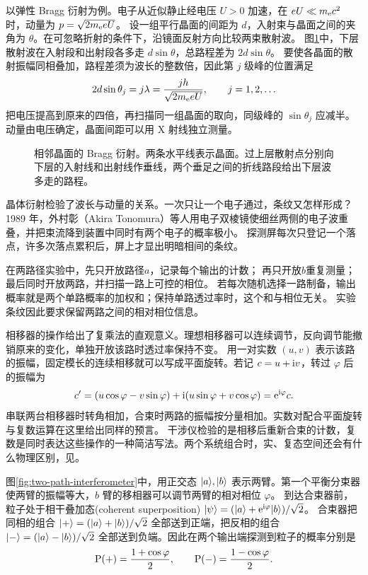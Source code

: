 以弹性 Bragg 衍射为例。电子从近似静止经电压 $U > 0$ 加速，在 $eU \ll m_\electron c^2$ 时，动量为 $p = \sqrt{2m_\electron eU}$。
设一组平行晶面的间距为 $d$，入射束与晶面之间的夹角为 $\theta$。在可忽略折射的条件下，沿镜面反射方向比较两束散射波。
图\ref{fig:bragg-path-difference}中，下层散射波在入射段和出射段各多走 $d\sin\theta$，总路程差为 $2d\sin\theta$。
要使各晶面的散射振幅同相叠加，路程差须为波长的整数倍，因此第 $j$ 级峰的位置满足
\begin{equation}\label{eq:qm-electron-bragg-condition}
    2d\sin\theta_j = j\lambda = \frac{jh}{\sqrt{2m_\electron eU}},\qquad j = 1,2,\ldots
\end{equation}
把电压提高到原来的四倍，再扫描同一组晶面的取向，同级峰的 $\sin\theta_j$ 应减半。动量由电压确定，晶面间距可以用 X 射线独立测量。

\begin{figure}[htbp]
    \centering{}
    \caption{相邻晶面的 Bragg 衍射。两条水平线表示晶面。过上层散射点分别向下层的入射线和出射线作垂线，两个垂足之间的折线路段给出下层波多走的路程。}
    \label{fig:bragg-path-difference}
\end{figure}

晶体衍射检验了波长与动量的关系。一次只让一个电子通过，条纹又怎样形成？1989 年，\label{exp:qm-tonomura}外村彰（Akira Tonomura）等人用电子双棱镜使细丝两侧的电子波重叠，并把束流降到装置中同时有两个电子的概率极小。
探测屏每次只登记一个落点，许多次落点累积后，屏上才显出明暗相间的条纹\cite{tonomura}。

在两路径实验中，先只开放路径$a$，记录每个输出的计数；
再只开放$b$重复测量；最后同时开放两路，并扫描一路上可控的相位。
若每次随机选择一路制备，输出概率就是两个单路概率的加权和；保持单路透过率时，这个和与相位无关。
实验条纹因此要求保留两路之间的相对相位信息。

相移器的操作给出了复乘法的直观意义。理想相移器可以连续调节，反向调节能撤销原来的变化，单独开放该路时透过率保持不变。
用一对实数 $(u,v)$ 表示该路的振幅，固定模长的连续相移就可以写成平面旋转。若记 $c = u + \i v$，转过 $\varphi$ 后的振幅为
\[
    c' = (u\cos\varphi - v\sin\varphi) + \i(u\sin\varphi + v\cos\varphi) = \e^{\i\varphi}c .
\]
串联两台相移器时转角相加，合束时两路的振幅按分量相加。实数对配合平面旋转与复数运算在这里给出同样的预言。
干涉仪检验的是相移后重新合束的计数，复数是同时表达这些操作的一种简洁写法。两个系统组合时，实、复态空间还会有什么物理区别，见。

图\ref{fig:two-path-interferometer}中，用正交态 $\ket{a},\ket{b}$ 表示两臂。第一个平衡分束器使两臂的振幅等大，$b$ 臂的移相器可以调节两臂的相对相位 $\varphi$。
到达合束器前，粒子处于相干叠加态(coherent superposition) $\ket{\psi} = (\ket{a} + \e^{\i\varphi}\ket{b})/\sqrt2$。
合束器把同相的组合 $\ket{+} = (\ket{a} + \ket{b})/\sqrt2$ 全部送到正端，把反相的组合 $\ket{-} = (\ket{a} - \ket{b})/\sqrt2$ 全部送到负端。因此在两个输出端探测到粒子的概率分别是
\begin{equation}
    \P(+) = \frac{1 + \cos\varphi}{2},\qquad \P(-) = \frac{1 - \cos\varphi}{2}.
    \label{eq:fringe}
\end{equation}

